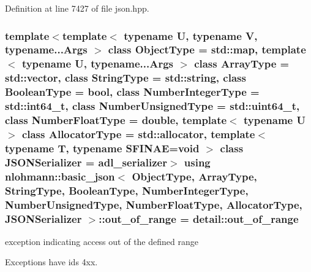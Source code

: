 Definition at line 7427 of file json.\+hpp.

\subsubsection[{\texorpdfstring{out\+\_\+of\+\_\+range}{out_of_range}}]{\setlength{\rightskip}{0pt plus 5cm}template$<$template$<$ typename U, typename V, typename...\+Args $>$ class Object\+Type = std\+::map, template$<$ typename U, typename...\+Args $>$ class Array\+Type = std\+::vector, class String\+Type  = std\+::string, class Boolean\+Type  = bool, class Number\+Integer\+Type  = std\+::int64\+\_\+t, class Number\+Unsigned\+Type  = std\+::uint64\+\_\+t, class Number\+Float\+Type  = double, template$<$ typename U $>$ class Allocator\+Type = std\+::allocator, template$<$ typename T, typename S\+F\+I\+N\+A\+E=void $>$ class J\+S\+O\+N\+Serializer = adl\+\_\+serializer$>$ using {\bf nlohmann\+::basic\+\_\+json}$<$ Object\+Type, Array\+Type, String\+Type, Boolean\+Type, Number\+Integer\+Type, Number\+Unsigned\+Type, Number\+Float\+Type, Allocator\+Type, J\+S\+O\+N\+Serializer $>$\+::{\bf out\+\_\+of\+\_\+range} =  {\bf detail\+::out\+\_\+of\+\_\+range}}\hypertarget{classnlohmann_1_1basic__json_a28f7c2f087274a0012eb7a2333ee1580}{}\label{classnlohmann_1_1basic__json_a28f7c2f087274a0012eb7a2333ee1580}


exception indicating access out of the defined range 

Exceptions have ids 4xx.

